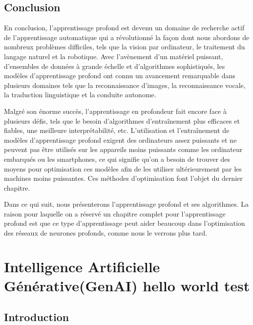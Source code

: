 \section{Conclusion}
En conclusion, l'apprentissage profond est devenu un domaine de recherche actif
de l'apprentissage automatique qui a révolutionné la façon dont nous abordons
de nombreux problèmes difficiles, tels que la vision par ordinateur, le
traitement du langage naturel et la robotique. Avec l'avènement d'un matériel
puissant, d'ensembles de données à grande échelle et d'algorithmes
sophistiqués, les modèles d'apprentissage profond ont connu un avancement
remarquable dans plusieurs domaines tels que la reconnaissance d'images, la
reconnaissance vocale, la traduction linguistique et la conduite autonome.

\medskip
Malgré son énorme succès, l'apprentissage en profondeur fait encore face à plusieurs défis, tels que le besoin d'algorithmes d'entraînement plus efficaces et fiables, une meilleure interprétabilité, etc. L’utilisation et l'entraînement de modèles d’apprentissage profond exigent des ordinateurs assez puissants et ne peuvent pas être utilisés sur les appareils moins puissants comme les ordinateur embarqués ou les smartphones, ce qui signifie qu'on a besoin de trouver des moyens pour optimisation ces modèles afin de les utiliser ultérieurement par les machines moins puissantes. Ces méthodes d'optimisation font l'objet du dernier chapitre.

\medskip
Dans ce qui suit, nous présenterons l'apprentissage profond et ses algorithmes. La raison pour laquelle on a réservé un chapitre complet pour l'apprentissage profond est que ce type d'apprentissage peut aider beaucoup dans l'optimisation des réseaux de neurones profonds, comme nous le verrons plus tard.

\clearpage






\chapter{Intelligence Artificielle Générative(GenAI)  hello world test }
\section{Introduction}

